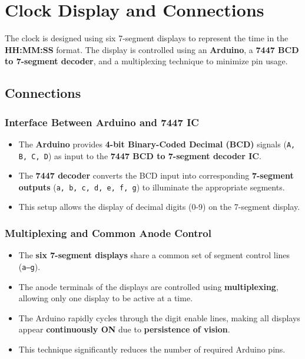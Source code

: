 \documentclass[journal]{IEEEtran}
\begin{document}
\section{Clock Display and Connections}

The clock is designed using six 7-segment displays to represent the time in the \textbf{HH:MM:SS} format. The display is controlled using an \textbf{Arduino}, a \textbf{7447 BCD to 7-segment decoder}, and a multiplexing technique to minimize pin usage.

\subsection{Connections}

\subsubsection{Interface Between Arduino and 7447 IC}
\begin{itemize}
    \item The \textbf{Arduino} provides \textbf{4-bit Binary-Coded Decimal (BCD)} signals (\texttt{A, B, C, D}) as input to the \textbf{7447 BCD to 7-segment decoder IC}.
    \item The \textbf{7447 decoder} converts the BCD input into corresponding \textbf{7-segment outputs} (\texttt{a, b, c, d, e, f, g}) to illuminate the appropriate segments.
    \item This setup allows the display of decimal digits (0-9) on the 7-segment display.
\end{itemize}

\subsubsection{Multiplexing and Common Anode Control}
\begin{itemize}
    \item The \textbf{six 7-segment displays} share a common set of segment control lines (\texttt{a--g}).
    \item The anode terminals of the displays are controlled using \textbf{multiplexing}, allowing only one display to be active at a time.
    \item The Arduino rapidly cycles through the digit enable lines, making all displays appear \textbf{continuously ON} due to \textbf{persistence of vision}.
    \item This technique significantly reduces the number of required Arduino pins.
\end{itemize}
\end{document}
